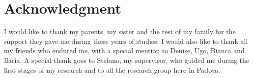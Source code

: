 \documentclass[../main.tex]{subfiles}
\begin{document}
\chapter{Acknowledgment}
\label{cap:aknowledgement}

I would like to thank my parents, my sister and the rest of my family for the support they gave me during these years of studies.
I would also like to thank all my friends who endured me, with a special mention to Denise, Ugo, Bianca and Ilaria.
A special thank goes to Stefano, my supervisor, who guided me during the first stages of my research and to all the research group here in Padova.
\end{document}
